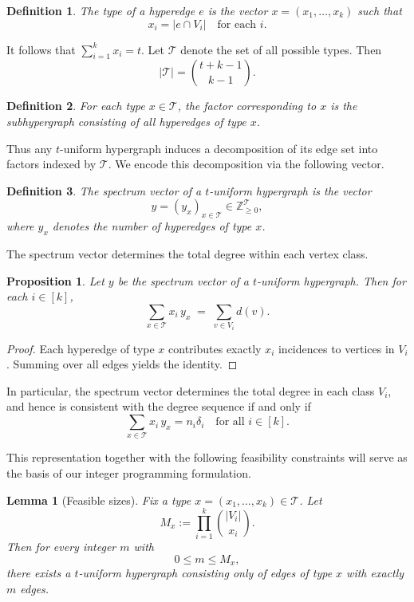 \documentclass[pdflatex,sn-mathphys-num]{sn-jnl}%
\theoremstyle{thmstyleone}%
\newtheorem{proposition}[theorem]{Proposition}%
\newtheorem{lemma}{Lemma}
\theoremstyle{thmstyletwo}%
\theoremstyle{thmstylethree}%
\newtheorem{definition}{Definition}%
\begin{document}
\begin{definition}
The \emph{type} of a hyperedge $e$ is the vector $x = (x_1,\dots,x_k)$ such that
\[
x_i = |e \cap V_i| \quad \text{for each } i.
\]
\end{definition}
\noindent It follows that $\sum_{i=1}^k x_i = t$.
Let $\mathcal{T}$ denote the set of all possible types. Then
\[
|\mathcal{T}| = \binom{t+k-1}{k-1}.
\]

\begin{definition}
For each type $x \in \mathcal{T}$, the \emph{factor} corresponding to $x$ is the subhypergraph consisting of all hyperedges of type $x$.
\end{definition}

Thus any $t$-uniform hypergraph induces a decomposition of its edge set into factors indexed by $\mathcal{T}$.
We encode this decomposition via the following vector.

\begin{definition}
The \emph{spectrum vector} of a $t$-uniform hypergraph is the vector
\[
y = (y_x)_{x \in \mathcal{T}} \in \mathbb{Z}_{\ge 0}^{\mathcal{T}},
\]
where $y_x$ denotes the number of hyperedges of type $x$.
\end{definition}

The spectrum vector determines the total degree within each vertex class.

\begin{proposition}\label{prop:spectrum_degrees}
Let $y$ be the spectrum vector of a $t$-uniform hypergraph. Then for each $i \in [k]$,
$$
\sum_{x \in \mathcal{T}} x_i \, y_x \;=\; \sum_{v \in V_i} d(v).  
$$

\end{proposition}

\begin{proof}
Each hyperedge of type $x$ contributes exactly $x_i$ incidences to vertices in $V_i$. Summing over all edges yields the identity.
\end{proof}

In particular, the spectrum vector determines the total degree in each class $V_i$, and hence is consistent with the degree sequence if and only if
\begin{equation}
\sum_{x \in \mathcal{T}} x_i \, y_x = n_i \delta_i
\quad \text{for all } i \in [k].
    \label{eq:degree-constraints}
\end{equation}


This representation together with the following feasibility constraints will serve as the basis of our integer programming formulation.
\begin{lemma}[Feasible sizes]\label{lem:feasible_sizes}
Fix a type $x=(x_1,\dots,x_k) \in \mathcal{T}$. Let
\[
M_x := \prod_{i=1}^k \binom{|V_i|}{x_i}.
\]
Then for every integer $m$ with
\[
0 \le m \le M_x,
\]
there exists a $t$-uniform hypergraph consisting only of edges of type $x$ with exactly $m$ edges.
\end{lemma}
\end{document}
